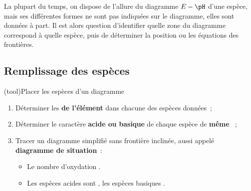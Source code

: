 \documentclass[../../main/main.tex]{subfiles}
\begin{document}
La plupart du temps, on dispose de l'allure du diagramme $E-\pH$ d'une espèce,
mais ses différentes formes ne sont pas indiquées sur le diagramme, elles sont
données à part. Il est alors question d'identifier quelle zone du diagramme
correspond à quelle espèce, puis de déterminer la position ou les équations des
frontières.

\subsection{Remplissage des espèces}

\begin{tcb*}(tool){Placer les espèces d'un diagramme}
	\begin{enumerate}[label=\sqenumi]
		\item Déterminer les \textbf{\no de l'élément} dans chacune des espèces
		      données~;
		\item Déterminer le caractère \textbf{acide ou basique} de chaque espèce de
		      \textbf{même \no}~;
		\item Tracer un diagramme simplifié sans frontière inclinée, aussi appelé
		      \textbf{diagramme de situation}~:
		      \begin{itemize}[label=$\scaleto{\triangleright}{7pt}$]
			      \item Le nombre d'oxydation .
			      \item Les espèces acides sont , les espèces basiques
			            .
		      \end{itemize}
	\end{enumerate}
\end{tcb*}
\end{document}
